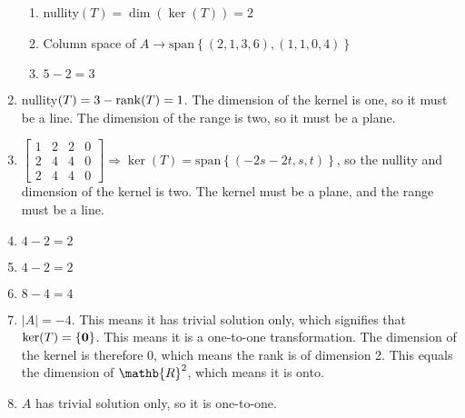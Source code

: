 \documentclass[12pt]{article}
\begin{document}
\begin{enumerate}
\begin{enumerate}
      \item nullity$(T)=\dim(\ker(T))=2$

      \item Column space of $A\rightarrow\text{span}\left\{ (2,1,3,6),(1,1,0,4) \right\}$

      \item $5-2=3$

    \end{enumerate}

    \setcounter{enumi}{32}

  \item nullity$(T)=3-\rank(T)=1$. The dimension of the kernel is one, so it must be a line. The dimension of the range is two, so it must be a plane.

    \setcounter{enumi}{38}

  \item $\left[ \begin{array}{ccc|c} 1 & 2 & 2 & 0\\ 2 & 4 & 4 & 0\\ 2 & 4 & 4 & 0 \end{array}\right]\Rightarrow\ker(T)=\text{span}\left\{ (-2s-2t,s,t) \right\}$, so the nullity and dimension of the kernel is two. The kernel must be a plane, and the range must be a line.

    \setcounter{enumi}{40}

  \item $4-2=2$

    \setcounter{enumi}{43}

  \item $4-2=2$

  \item $8-4=4$

    \setcounter{enumi}{46}

  \item $|A|=-4$. This means it has trivial solution only, which signifies that $\ker(T)=\left\{ \bold{0} \right\}$. This means it is a one-to-one transformation. The dimension of the kernel is therefore 0, which means the rank is of dimension 2. This equals the dimension of $\mathb{R}^2$, which means it is onto.

    \setcounter{enumi}{53}

  \item $A$ has trivial solution only, so it is one-to-one.


\end{enumerate}
\end{document}
